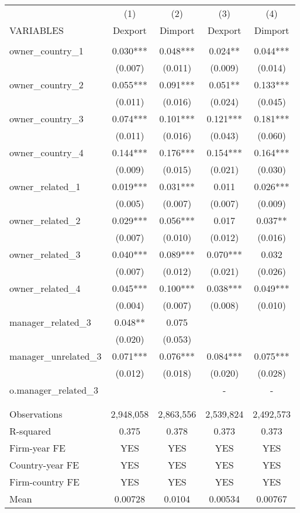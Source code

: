 \begin{tabular}{lcccc} \hline
 & (1) & (2) & (3) & (4) \\
VARIABLES & Dexport & Dimport & Dexport & Dimport \\ \hline
 &  &  &  &  \\
owner\_country\_1 & 0.030*** & 0.048*** & 0.024** & 0.044*** \\
 & (0.007) & (0.011) & (0.009) & (0.014) \\
owner\_country\_2 & 0.055*** & 0.091*** & 0.051** & 0.133*** \\
 & (0.011) & (0.016) & (0.024) & (0.045) \\
owner\_country\_3 & 0.074*** & 0.101*** & 0.121*** & 0.181*** \\
 & (0.011) & (0.016) & (0.043) & (0.060) \\
owner\_country\_4 & 0.144*** & 0.176*** & 0.154*** & 0.164*** \\
 & (0.009) & (0.015) & (0.021) & (0.030) \\
owner\_related\_1 & 0.019*** & 0.031*** & 0.011 & 0.026*** \\
 & (0.005) & (0.007) & (0.007) & (0.009) \\
owner\_related\_2 & 0.029*** & 0.056*** & 0.017 & 0.037** \\
 & (0.007) & (0.010) & (0.012) & (0.016) \\
owner\_related\_3 & 0.040*** & 0.089*** & 0.070*** & 0.032 \\
 & (0.007) & (0.012) & (0.021) & (0.026) \\
owner\_related\_4 & 0.045*** & 0.100*** & 0.038*** & 0.049*** \\
 & (0.004) & (0.007) & (0.008) & (0.010) \\
manager\_related\_3 & 0.048** & 0.075 &  &  \\
 & (0.020) & (0.053) &  &  \\
manager\_unrelated\_3 & 0.071*** & 0.076*** & 0.084*** & 0.075*** \\
 & (0.012) & (0.018) & (0.020) & (0.028) \\
o.manager\_related\_3 &  &  & - & - \\
 &  &  &  &  \\
 &  &  &  &  \\
Observations & 2,948,058 & 2,863,556 & 2,539,824 & 2,492,573 \\
R-squared & 0.375 & 0.378 & 0.373 & 0.373 \\
Firm-year FE & YES & YES & YES & YES \\
Country-year FE & YES & YES & YES & YES \\
Firm-country FE & YES & YES & YES & YES \\
 Mean & 0.00728 & 0.0104 & 0.00534 & 0.00767 \\ \hline
\end{tabular}

